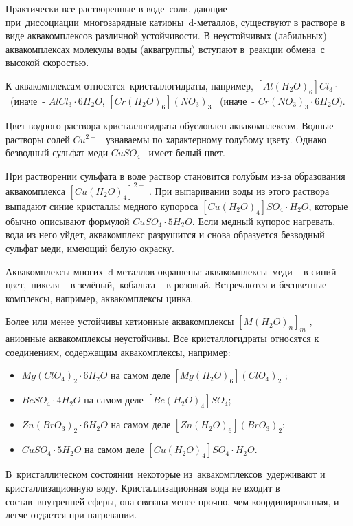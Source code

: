\documentclass[11pt]{article}
\begin{document}
Практически все растворенные в воде соли, дающие при диссоциации многозарядные
катионы d-металлов, существуют в растворе в виде аквакомплексов различной
устойчивости. В неустойчивых (лабильных) аквакомплексах молекулы воды (аквагруппы)
вступают в реакции обмена с высокой скоростью.

К аквакомплексам относятся кристаллогидраты, например, $[Al(H_2 O) _6 ]Cl_3 \cdot$ (иначе -
$AlCl_3\cdot 6H_2O$, 
$[Cr(H _2 O) _6 ](NO _3 ) _3$  (иначе - $Cr(NO _3 ) _3 \cdot  6H _2 O)$.

Цвет водного раствора кристаллогидрата обусловлен аквакомплексом. Водные растворы
солей $Cu ^{2+}$  узнаваемы по характерному голубому цвету. Oднако безводный сульфат меди
$CuSO_4$  имеет белый цвет. 

При растворении сульфата в воде раствор становится голубым
из-за образования аквакомплекса $[Cu(H _2 O)_4] ^{2+}$ . При выпаривании воды из этого раствора
выпадают синие кристаллы медного купороса $[Cu(H _2 O) _4 ]SO _4 \cdot H _2 O$, которые обычно
описывают формулой $CuSO _4 \cdot 5H _2 O$. Если медный купорос нагревать, вода из него уйдет,
аквакомплекс разрушится и снова образуется безводный сульфат меди, имеющий белую
окраску.

Аквакомплексы многих d-металлов окрашены: аквакомплексы меди - в синий
цвет, никеля - в зелёный, кобальта - в розовый. Встречаются и бесцветные комплексы,
например, аквакомплексы цинка.

Более или менее устойчивы катионные аквакомплексы $[M(H _2 O) _n ]_m$ , анионные
аквакомплексы неустойчивы. Все кристаллогидраты относятся к соединениям,
содержащим аквакомплексы, например:
\begin{itemize}
\item$Mg(ClO_4 ) _2 \cdot 6H _2 O$ на самом деле $[Mg(H _2 O) _6 ](ClO _4 ) _2$ ;

\item $BeSO _4 \cdot 4H _2 O$ на самом деле $[Be(H _2 O) _4 ]SO _4 $;

\item $Zn(BrO _3 ) _2 \cdot 6H_2 O$ на самом деле $[Zn(H _2 O) _6 ](BrO _3 ) _2 $;

\item $CuSO_4 \cdot 5H _2 O$ на самом деле $[Cu(H _2 O) _4 ]SO _4 \cdot H _2 O$.
\end{itemize}


В кристаллическом состоянии некоторые из аквакомплексов удерживают и
кристаллизационную воду. Кристаллизационная вода не входит в состав внутренней
сферы, она связана менее прочно, чем координированная, и легче отдается при
нагревании.
\end{document}

